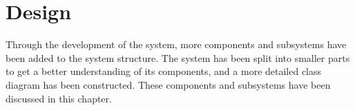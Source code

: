 \chapter{Design} \label{ch:architectural_design}
Through the development of the system, more components and subsystems have been added to the system structure. The system has been split into smaller parts to get a better understanding of its components, and a more detailed class diagram has been constructed. These components and subsystems have been discussed in this chapter.
